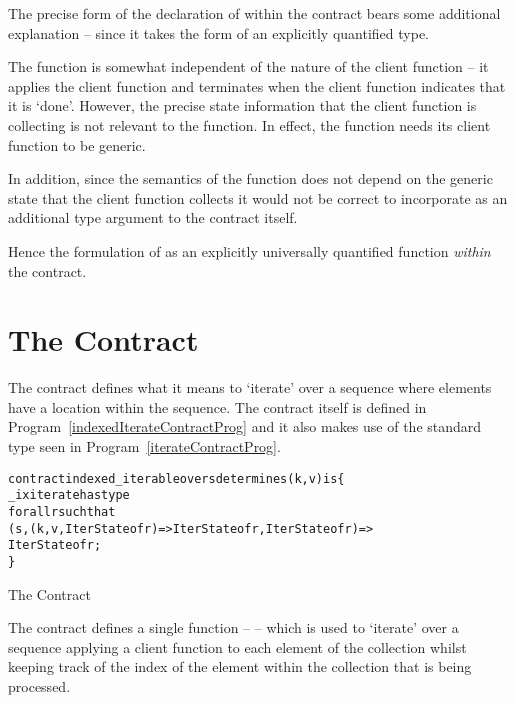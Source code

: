 \begin{aside}
The precise form of the declaration of  within the  contract bears some additional explanation -- since it takes the form of an explicitly quantified type.

The  function is somewhat independent of the nature of the client function -- it applies the client function and terminates when the client function indicates that it is `done'. However, the precise state information that the client function is collecting is not relevant to the  function. In effect, the  function needs its client function to be generic.

In addition, since the semantics of the  function does not depend on the generic state that the client function collects it would not be correct to incorporate  as an additional type argument to the contract itself.

Hence the formulation of  as an explicitly universally quantified function \emph{within} the contract.
\end{aside}

\section{The  Contract}
\label{indexedIterableContract}
The  contract defines what it means to `iterate' over a sequence where elements have a location within the sequence. The contract itself is defined in Program~\vref{indexedIterateContractProg} and it also makes use of the standard  type seen in Program~\vref{iterateContractProg}.

\begin{program}[H]
\begin{alltt}
contract indexed\_iterable over s determines (k,v) is \{
  _ixiterate has type 
    for all r such that 
      (s,(k,v,IterState of r)=>IterState of r,IterState of r) => 
        IterState of r;
\}
\end{alltt}
\caption{The  Contract\label{indexedIterateContractProg}}
\end{program}

The  contract defines a single function --  -- which is used to `iterate' over a sequence applying a client function to each element of the collection whilst keeping track of the index of the element within the collection that is being processed.

